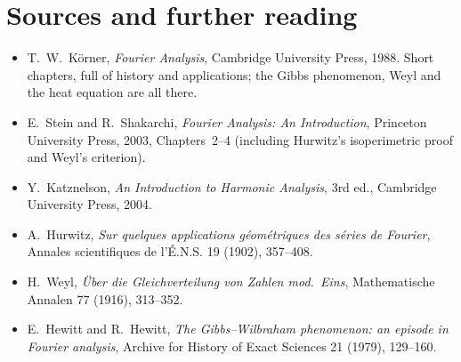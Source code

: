 \section*{Sources and further reading}

\begin{itemize}
\item T.~W.~K\"orner, \emph{Fourier Analysis}, Cambridge University Press, 1988. Short chapters, full of history and
applications; the Gibbs phenomenon, Weyl and the heat equation are all there.
\item E.~Stein and R.~Shakarchi, \emph{Fourier Analysis: An Introduction}, Princeton University Press, 2003, Chapters~2--4
(including Hurwitz's isoperimetric proof and Weyl's criterion).
\item Y.~Katznelson, \emph{An Introduction to Harmonic Analysis}, 3rd ed., Cambridge University Press, 2004.
\item A.~Hurwitz, \emph{Sur quelques applications g\'eom\'etriques des s\'eries de Fourier}, Annales scientifiques de l'\'E.N.S.
19 (1902), 357--408.
\item H.~Weyl, \emph{\"Uber die Gleichverteilung von Zahlen mod.~Eins}, Mathematische Annalen 77 (1916), 313--352.
\item E.~Hewitt and R.~Hewitt, \emph{The Gibbs--Wilbraham phenomenon: an episode in Fourier analysis}, Archive for History of
Exact Sciences 21 (1979), 129--160.
\end{itemize}
